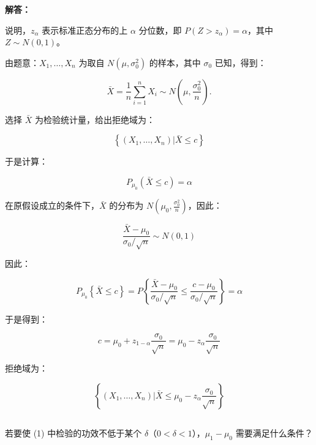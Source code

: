 \documentclass[12pt,a4paper]{article}
\begin{document}
\begin{answerbox}
\textbf{解答：}

说明，$z_\alpha$ 表示标准正态分布的上 $\alpha$ 分位数，即 $P(Z > z_\alpha) = \alpha$，其中 $Z \sim N(0,1)$。

由题意：$X_1,\ldots,X_n$ 为取自 $N(\mu,\sigma_0^2)$ 的样本，其中 $\sigma_0$ 已知，得到：

$$
\bar{X} = \frac{1}{n}\sum_{i=1}^{n} X_i \sim N\left(\mu, \frac{\sigma_0^2}{n}\right).
$$

选择 $\bar{X}$ 为检验统计量，给出拒绝域为：

$$
\left\{(X_1, \ldots, X_n)| \bar{X} \leq c\right\}
$$

于是计算：

$$
P_{\mu_0}\left(\bar{X} \leq c\right) = \alpha
$$

在原假设成立的条件下，$\bar{X}$ 的分布为 $N\left(\mu_0, \frac{\sigma_0^2}{n}\right)$，因此：

$$
\frac{\bar{X}-\mu_0}{\sigma_0/\sqrt{n}} \sim N(0,1)
$$

因此：

$$
P_{\mu_0}\left\{\bar{X} \leq c\right\} = P\left\{\frac{\bar{X}-\mu_0}{\sigma_0/\sqrt{n}} \leq \frac{c-\mu_0}{\sigma_0/\sqrt{n}}\right\} = \alpha
$$

于是得到：

$$
c = \mu_0 + z_{1-\alpha} \frac{\sigma_0}{\sqrt{n}} = \mu_0 - z_{\alpha} \frac{\sigma_0}{\sqrt{n}}
$$

拒绝域为：

$$
\left\{(X_1, \ldots, X_n)| \bar{X} \leq \mu_0 - z_{\alpha} \frac{\sigma_0}{\sqrt{n}}\right\}
$$

\end{answerbox}

\subsection{}

若要使 (1) 中检验的功效不低于某个 $\delta$（$0<\delta<1$），$\mu_1-\mu_0$ 需要满足什么条件？
\end{document}
